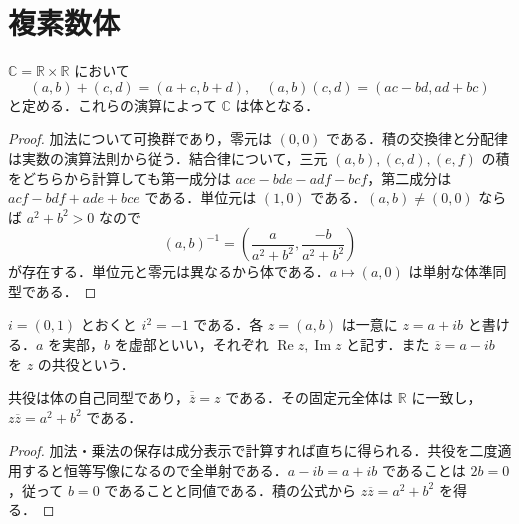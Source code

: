 \section{複素数体}
\begin{prop}[複素数体の構成]
$\mathbb C=\mathbb R\times\mathbb R$ において
\[
 (a,b)+(c,d)=(a+c,b+d),\quad
 (a,b)(c,d)=(ac-bd,ad+bc)
\]
と定める．これらの演算によって $\mathbb C$ は体となる．
\end{prop}
\begin{proof}
加法について可換群であり，零元は $(0,0)$ である．積の交換律と分配律は実数の演算法則から従う．結合律について，三元 $(a,b),(c,d),(e,f)$ の積をどちらから計算しても第一成分は $ace-bde-adf-bcf$，第二成分は $acf-bdf+ade+bce$ である．単位元は $(1,0)$ である．$(a,b)\ne(0,0)$ ならば $a^2+b^2>0$ なので
\[
 (a,b)^{-1}=\left(\frac{a}{a^2+b^2},\frac{-b}{a^2+b^2}\right)
\]
が存在する．単位元と零元は異なるから体である．$a\mapsto(a,0)$ は単射な体準同型である．
\end{proof}
\begin{defn}[実部・虚部と共役]
$i=(0,1)$ とおくと $i^2=-1$ である．各 $z=(a,b)$ は一意に $z=a+ib$ と書ける．$a$ を実部，$b$ を虚部といい，それぞれ $\operatorname{Re}z,\operatorname{Im}z$ と記す．また $\overline z=a-ib$ を $z$ の共役という．
\end{defn}
\begin{prop}[複素共役の性質]
共役は体の自己同型であり，$\overline{\overline z}=z$ である．その固定元全体は $\mathbb R$ に一致し，$z\overline z=a^2+b^2$ である．
\end{prop}
\begin{proof}
加法・乗法の保存は成分表示で計算すれば直ちに得られる．共役を二度適用すると恒等写像になるので全単射である．$a-ib=a+ib$ であることは $2b=0$，従って $b=0$ であることと同値である．積の公式から $z\overline z=a^2+b^2$ を得る．
\end{proof}
